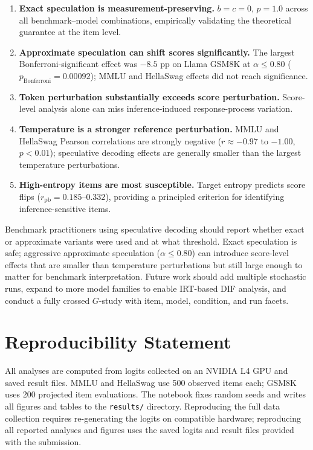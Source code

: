 \documentclass{article}
\begin{document}
\begin{enumerate}
    \item \textbf{Exact speculation is measurement-preserving.} $b=c=0$, $p=1.0$ across all benchmark--model combinations, empirically validating the theoretical guarantee at the item level.
    \item \textbf{Approximate speculation can shift scores significantly.} The largest Bonferroni-significant effect was $-8.5$ pp on Llama GSM8K at $\alpha \leq 0.80$ ($p_{\text{Bonferroni}} = 0.00092$); MMLU and HellaSwag effects did not reach significance.
    \item \textbf{Token perturbation substantially exceeds score perturbation.} Score-level analysis alone can miss inference-induced response-process variation.
    \item \textbf{Temperature is a stronger reference perturbation.} MMLU and HellaSwag Pearson correlations are strongly negative ($r \approx -0.97$ to $-1.00$, $p < 0.01$); speculative decoding effects are generally smaller than the largest temperature perturbations.
    \item \textbf{High-entropy items are most susceptible.} Target entropy predicts score flips ($r_{\text{pb}} = 0.185$--$0.332$), providing a principled criterion for identifying inference-sensitive items.
\end{enumerate}

Benchmark practitioners using speculative decoding should report whether exact or approximate variants were used and at what threshold. Exact speculation is safe; aggressive approximate speculation ($\alpha \leq 0.80$) can introduce score-level effects that are smaller than temperature perturbations but still large enough to matter for benchmark interpretation. Future work should add multiple stochastic runs, expand to more model families to enable IRT-based DIF analysis, and conduct a fully crossed $G$-study with item, model, condition, and run facets.

\section*{Reproducibility Statement}

All analyses are computed from logits collected on an NVIDIA L4 GPU and saved result files. MMLU and HellaSwag use 500 observed items each; GSM8K uses 200 projected item evaluations. The notebook fixes random seeds and writes all figures and tables to the \texttt{results/} directory. Reproducing the full data collection requires re-generating the logits on compatible hardware; reproducing all reported analyses and figures uses the saved logits and result files provided with the submission.
\end{document}

